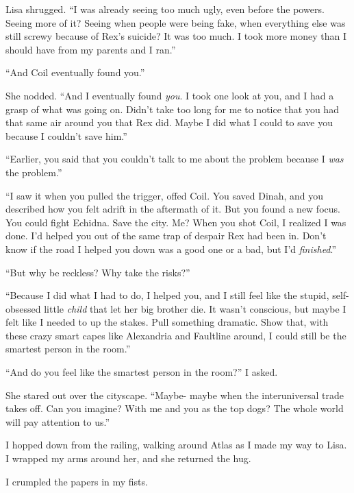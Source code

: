 Lisa shrugged.  ``I was already seeing too much ugly, even before the powers.  Seeing more of it?  Seeing when people were being fake, when everything else was still screwy because of Rex's suicide?  It was too much.  I took more money than I should have from my parents and I ran.''



``And Coil eventually found you.''



She nodded.  ``And I eventually found \emph{you}.  I took one look at you, and I had a grasp of what was going on.  Didn't take too long for me to notice that you had that same air around you that Rex did.  Maybe I did what I could to save you because I couldn't save him.''



``Earlier, you said that you couldn't talk to me about the problem because I \emph{was} the problem.''



``I saw it when you pulled the trigger, offed Coil.  You saved Dinah, and you described how you felt adrift in the aftermath of it.  But you found a new focus.  You could fight Echidna.  Save the city.  Me?  When you shot Coil, I realized I was done.  I'd helped you out of the same trap of despair Rex had been in.  Don't know if the road I helped you down was a good one or a bad, but I'd \emph{finished}.''



``But why be reckless?  Why take the risks?''



``Because I did what I had to do, I helped you, and I still feel like the stupid, self-obsessed little \emph{child} that let her big brother die.  It wasn't conscious, but maybe I felt like I needed to up the stakes.  Pull something dramatic.  Show that, with these crazy smart capes like Alexandria and Faultline around, I could still be the smartest person in the room.''



``And do you feel like the smartest person in the room?''  I asked.



She stared out over the cityscape.  ``Maybe- maybe when the interuniversal trade takes off.  Can you imagine?  With me and you as the top dogs?  The whole world will pay attention to us.''



I hopped down from the railing, walking around Atlas as I made my way to Lisa.  I wrapped my arms around her, and she returned the hug.



I crumpled the papers in my fists.





